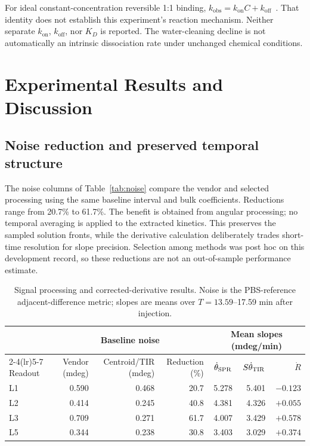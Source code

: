 \documentclass[lettersize,journal]{IEEEtran}
\begin{document}
For ideal constant-concentration reversible 1:1 binding,
$k_{\mathrm{obs}}=k_{\mathrm{on}}C+k_{\mathrm{off}}$~\cite{schuck}.
That identity does not establish this experiment's reaction mechanism.
Neither separate $k_{\mathrm{on}}$, $k_{\mathrm{off}}$, nor $K_D$ is reported.
The water-cleaning decline is not automatically an intrinsic dissociation
rate under unchanged chemical conditions.

\section{Experimental Results and Discussion}\label{sec:results}
\subsection{Noise reduction and preserved temporal structure}
The noise columns of Table~\ref{tab:noise} compare the vendor and selected processing using the
same baseline interval and bulk coefficients. Reductions range from 20.7\%
to 61.7\%. The benefit is obtained from angular processing; no temporal
averaging is applied to the extracted kinetics. This preserves the sampled
solution fronts, while the derivative calculation deliberately trades
short-time resolution for slope precision. Selection among methods was
post hoc on this development record, so these reductions are not an
out-of-sample performance estimate.
\begin{table}[t]\centering
\caption{Signal processing and corrected-derivative results. Noise is the
PBS-reference adjacent-difference metric; slopes are means over
$T=13.59$--17.59 min after injection.}
\label{tab:noise}\label{tab:slopes}
\begin{tabular}{lrrrrrr}\toprule
& \multicolumn{3}{c}{Baseline noise} & \multicolumn{3}{c}{Mean slopes (mdeg/min)}\\
\cmidrule(lr){2-4}\cmidrule(lr){5-7}
Readout & Vendor (mdeg) & Centroid/TIR (mdeg) & Reduction (\%) & $\dot\theta_{\rm SPR}$ & $S\dot\theta_{\rm TIR}$ & $\dot R$\\\midrule
L1 & 0.590 & 0.468 & 20.7 & 5.278 & 5.401 & $-0.123$\\
L2 & 0.414 & 0.245 & 40.8 & 4.381 & 4.326 & $+0.055$\\
L3 & 0.709 & 0.271 & 61.7 & 4.007 & 3.429 & $+0.578$\\
L5 & 0.344 & 0.238 & 30.8 & 3.403 & 3.029 & $+0.374$\\\bottomrule
\end{tabular}
\end{table}
\end{document}
